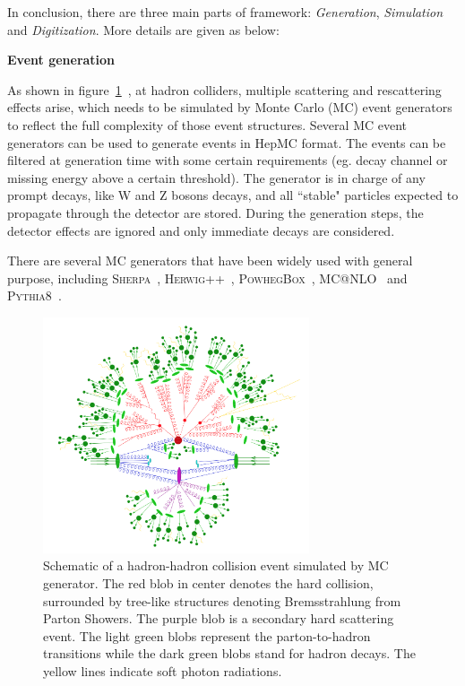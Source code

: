 In conclusion, there are three main parts of framework: \textit{Generation}, \textit{Simulation} and \textit{Digitization}.
More details are given as below:

\textbf{Event generation}

As shown in figure~\ref{fig:mc_event_structure}~\cite{Hoche:2014rga}, at hadron colliders, multiple scattering and rescattering effects arise, which needs to be simulated by Monte Carlo (MC) event generators to reflect the full complexity of those event structures.
Several MC event generators can be used to generate events in HepMC format.
The events can be filtered at generation time with some certain requirements (eg. decay channel or missing energy above a certain threshold).
The generator is in charge of any prompt decays, like W and Z bosons decays, and all ``stable" particles expected to propagate through the detector are stored. 
During the generation steps, the detector effects are ignored and only immediate decays are considered.

There are several MC generators that have been widely used with general purpose, including \textsc{Sherpa}~\cite{Gleisberg_2009}, \textsc{Herwig++}~\cite{Bahr2008}, \textsc{PowhegBox}~\cite{Nason:2004rx}, \textsc{MC@NLO}~\cite{Frixione_2002} and \textsc{Pythia8}~\cite{Sjostrand:2007gs}.

\begin{figure}[!htb]
  \centering
  \includegraphics[width=0.7\textwidth]{figures/Simulation/mc_event_structure.png}
  \caption{Schematic of a hadron-hadron collision event simulated by MC generator. The red blob in center denotes the hard collision, surrounded by tree-like structures denoting Bremsstrahlung from Parton Showers. The purple blob is a secondary hard scattering event. The light green blobs represent the parton-to-hadron transitions while the dark green blobs stand for hadron decays. The yellow lines indicate soft photon radiations.}
  \label{fig:mc_event_structure}
\end{figure}

